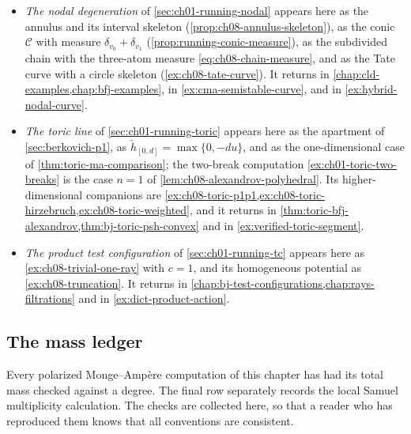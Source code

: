 \begin{itemize}
\item \emph{The nodal degeneration} of \cref{sec:ch01-running-nodal} appears
here as the annulus and its interval skeleton
(\cref{prop:ch08-annulus-skeleton}), as the conic $\mathcal C$ with measure
$\delta_{v_0}+\delta_{v_1}$ (\cref{prop:running-conic-measure}), as the
subdivided chain with the three-atom measure \eqref{eq:ch08-chain-measure},
and as the Tate curve with a circle skeleton
(\cref{ex:ch08-tate-curve}).  It returns in
\cref{chap:cld-examples,chap:bfj-examples}, in
\cref{ex:cma-semistable-curve}, and in \cref{ex:hybrid-nodal-curve}.

\item \emph{The toric line} of \cref{sec:ch01-running-toric} appears here as
the apartment of \cref{sec:berkovich-p1}, as
$\check h_{[0,d]}=\max\{0,-du\}$, and as the one-dimensional case of
\cref{thm:toric-ma-comparison}; the two-break computation
\cref{ex:ch01-toric-two-breaks} is the case $n=1$ of
\cref{lem:ch08-alexandrov-polyhedral}.  Its higher-dimensional companions are
\cref{ex:ch08-toric-p1p1,ex:ch08-toric-hirzebruch,ex:ch08-toric-weighted},
and it returns in \cref{thm:toric-bfj-alexandrov,thm:bj-toric-psh-convex} and
in \cref{ex:verified-toric-segment}.

\item \emph{The product test configuration} of \cref{sec:ch01-running-tc}
appears here as \cref{ex:ch08-trivial-one-ray} with $c=1$, and its
homogeneous potential as \cref{ex:ch08-truncation}.  It returns in
\cref{chap:bj-test-configurations,chap:rays-filtrations} and in
\cref{ex:dict-product-action}.
\end{itemize}

\subsection{The mass ledger}
\label{sec:ch08-mass-ledger}

Every polarized Monge--Amp\`ere computation of this chapter has had its
total mass checked against a degree.  The final row separately records the
local Samuel multiplicity calculation.  The checks are collected here, so that a reader
who has reproduced them knows that all conventions are consistent.


